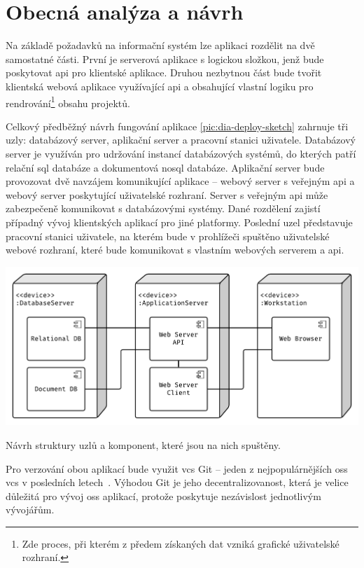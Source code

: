 \chapter{Obecná analýza a návrh}

Na základě požadavků na informační systém lze aplikaci rozdělit na dvě samostatné části. První je serverová aplikace s logickou složkou, jenž bude poskytovat \gls{api} pro klientské aplikace. Druhou nezbytnou část bude tvořit klientská webová aplikace využívající \gls{api} a obsahující vlastní logiku pro rendrování\footnote{Zde proces, při kterém z předem získaných dat vzniká grafické uživatelské rozhraní.} obsahu projektů.

Celkový předběžný návrh fungování aplikace \ref{pic:dia-deploy-sketch} zahrnuje tři uzly: databázový server, aplikační server a pracovní stanici uživatele. Databázový server je využíván pro udržování instancí databázových systémů, do kterých patří relační \gls{sql} databáze a dokumentová \gls{nosql} databáze. Aplikační server bude provozovat dvě navzájem komunikující aplikace -- webový server s veřejným \gls{api} a webový server poskytující uživatelské rozhraní. Server s veřejným \gls{api} může zabezpečeně komunikovat s databázovými systémy. Dané rozdělení zajistí případný vývoj klientských aplikací pro jiné platformy. Poslední uzel představuje pracovní stanici uživatele, na kterém bude v prohlížeči spuštěno uživatelské webové rozhraní, které bude komunikovat s vlastním webových serverem a \gls{api}.

\begin{fig:illustration}
   \includegraphics[width=1\textwidth]{images/dia-deploy-sketch.pdf}
   \caption{Návrh struktury uzlů a komponent, které jsou na nich spuštěny.}\label{pic:dia-deploy-sketch}
\end{fig:illustration}

Pro verzování obou aplikací bude využit \gls{vcs} Git -- jeden z nejpopulárnějších \gls{oss} \gls{vcs} v posledních letech~\cite{vcsG2}. Výhodou Git je jeho decentralizovanost, která je velice důležitá pro vývoj \gls{oss} aplikací, protože poskytuje nezávislost jednotlivým vývojářům.



